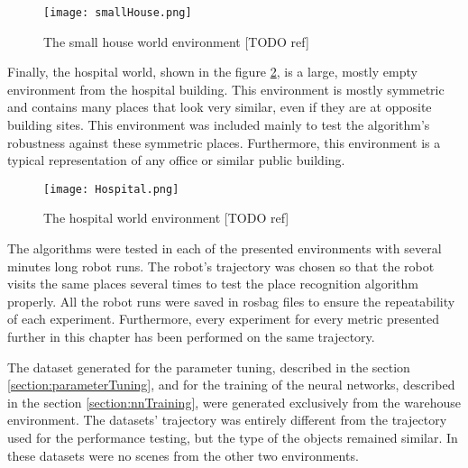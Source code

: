 \begin{figure}[htpb]
    \centering
    \texttt{[image: smallHouse.png]}
    \caption{The small house world environment [TODO ref]} \label{fig:smallHouse}
\end{figure}

Finally, the hospital world, shown in the figure \ref{fig:hospitalWorld}, is a large, mostly empty environment from the hospital building. This environment is mostly symmetric and contains many places that look very similar, even if they are at opposite building sites. This environment was included mainly to test the algorithm's robustness against these symmetric places. Furthermore, this environment is a typical representation of any office or similar public building.\par

\begin{figure}[htpb]
    \centering
    \texttt{[image: Hospital.png]}
    \caption{The hospital world environment [TODO ref]} \label{fig:hospitalWorld}
\end{figure}

The algorithms were tested in each of the presented environments with several minutes long robot runs. The robot's trajectory was chosen so that the robot visits the same places several times to test the place recognition algorithm properly. All the robot runs were saved in rosbag files to ensure the repeatability of each experiment. Furthermore, every experiment for every metric presented further in this chapter has been performed on the same trajectory.\par
The dataset generated for the parameter tuning, described in the section \ref{section:parameterTuning}, and for the training of the neural networks, described in the section \ref{section:nnTraining}, were generated exclusively from the warehouse environment. The datasets' trajectory was entirely different from the trajectory used for the performance testing, but the type of the objects remained similar. In these datasets were no scenes from the other two environments.
